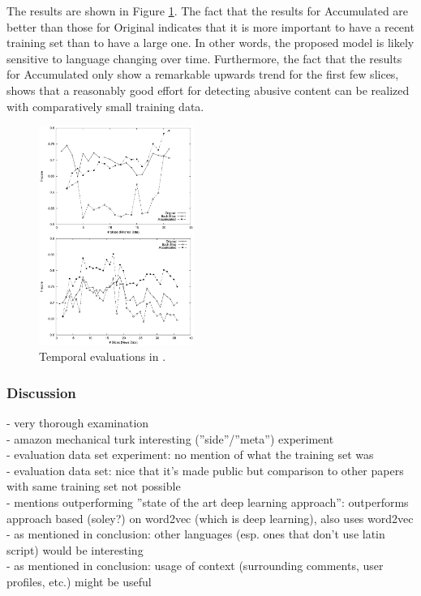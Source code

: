 \documentclass{proseminar}
\begin{document}
The results are shown in Figure \ref{fig:yahoo_temporal}. The fact that the results for Accumulated are better than those for Original indicates that it is more important to have a recent training set than to have a large one. In other words, the proposed model is likely sensitive to language changing over time. Furthermore, the fact that the results for Accumulated only show a remarkable upwards trend for the first few slices, shows that a reasonably good effort for detecting abusive content can be realized with comparatively small training data.

\begin{figure}
\centering
\includegraphics[width=0.45\textwidth]{img/yahoo_temporal}
\caption{Temporal evaluations in \cite{Yahoo:2016}.}
\label{fig:yahoo_temporal}
\end{figure}

\subsubsection{Discussion}
- very thorough examination\\
- amazon mechanical turk interesting (''side''/''meta'') experiment\\
- evaluation data set experiment: no mention of what the training set was\\
- evaluation data set: nice that it's made public but comparison to other papers with same training set not possible\\
- mentions outperforming ''state of the art deep learning approach'': outperforms approach based (soley?) on word2vec (which is deep learning), also uses word2vec\\
- as mentioned in conclusion: other languages (esp. ones that don't use latin script) would be interesting\\
- as mentioned in conclusion: usage of context (surrounding comments, user profiles, etc.) might be useful
\end{document}
